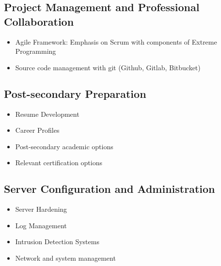 \documentclass[letterpaper,10pt,english]{sphinxmanual}
\begin{document}
\subsection{Project Management and Professional Collaboration}
\label{cybersecurity:project-management-and-professional-collaboration}\begin{itemize}
\item {} 
Agile Framework: Emphasis on Scrum with components of Extreme Programming

\item {} 
Source code management with git (Github, Gitlab, Bitbucket)

\end{itemize}


\subsection{Post-secondary Preparation}
\label{cybersecurity:post-secondary-preparation}\begin{itemize}
\item {} 
Resume Development

\item {} 
Career Profiles

\item {} 
Post-secondary academic options

\item {} 
Relevant certification options

\end{itemize}


\subsection{Server Configuration and Administration}
\label{cybersecurity:server-configuration-and-administration}\begin{itemize}
\item {} 
Server Hardening

\item {} 
Log Management

\item {} 
Intrusion Detection Systems

\item {} 
Network and system management

\end{itemize}
\end{document}
